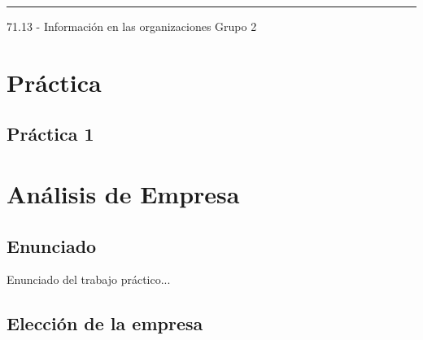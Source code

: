 \documentclass[12pt,titlepage]{report}
\begin{document}
\begin{titlepage}
\vfill

\hrule
\vspace{0.2cm}

\noindent\small{71.13 - Información en las organizaciones \hfill Grupo 2}

\end{titlepage}



\setcounter{page}{1}

\tableofcontents
\newpage




\part{Práctica}

\chapter{Práctica 1}

%

\part{Análisis de Empresa}
\chapter*{Enunciado}
Enunciado del trabajo práctico...

\chapter{Elección de la empresa}


\end{document}
